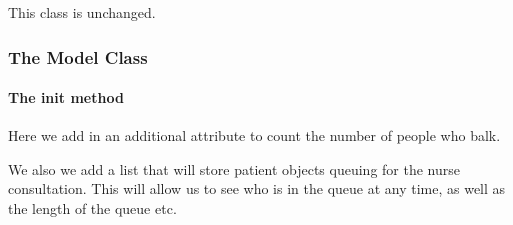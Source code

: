 \documentclass[
  letterpaper,
  DIV=11,
  numbers=noendperiod]{scrreprt}
\let\oldparagraph\paragraph
\renewcommand{\paragraph}[1]{\oldparagraph{#1}\mbox{}}
\begin{document}
This class is unchanged.

\subsubsection{The Model Class}\label{the-model-class-6}

\paragraph{\texorpdfstring{The \textbf{init}
method}{The init method}}\label{the-init-method-4}

Here we add in an additional attribute to count the number of people who
balk.

We also we add a list that will store patient objects queuing for the
nurse consultation. This will allow us to see who is in the queue at any
time, as well as the length of the queue etc.
\end{document}

